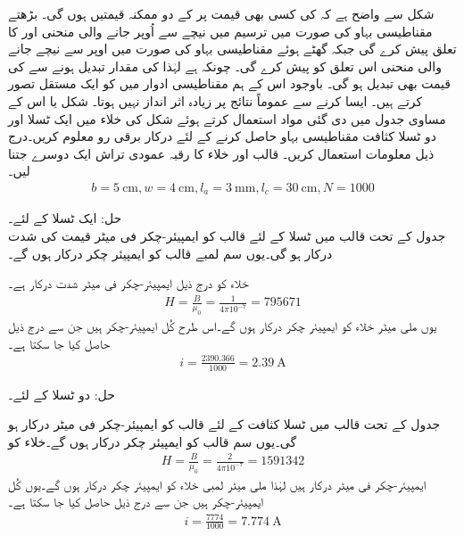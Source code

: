 شکل  سے واضح ہے کہ  کی کسی بھی قیمت پر  کے  دو ممکنہ قیمتیں ہوں گی۔ بڑھتے مقناطیسی بہاو کی صورت میں ترسیم میں نیچے سے اُوپر جانے والی منحنی  اور  کا تعلق پیش کرے گی جبکہ گھٹے ہوئے مقناطیسی بہاو کی صورت میں  اوپر سے نیچے جانے والی منحنی اس تعلق کو پیش کرے  گی۔  چونکہ  ہے  لہٰذا  کی  مقدار تبدیل ہونے سے  کی قیمت  بھی تبدیل ہو گی۔ باوجود اس کے ہم مقناطیسی ادوار میں   کو ایک مستقل تصور کرتے ہیں۔ ایسا کرنے سے عموماً نتائج پر زیادہ اثر انداز نہیں ہوتا۔
%
شکل   یا اس کے مساوی جدول  میں دی گئی مواد  استعمال کرتے ہوئے شکل   کی خلاء میں ایک ٹسلا اور دو ٹسلا کثافت  مقناطیسی بہاو حاصل کرنے کے لئے درکار برقی رو معلوم کریں۔درج ذیل معلومات استعمال کریں۔ قالب اور خلاء کا رقبہ عمودی تراش ایک دوسرے جتنا لیں۔
\begin{align*}
b=\SI{5}{\centi\meter},w=\SI{4}{\centi\meter},l_a=\SI{3}{\milli\meter},l_c=\SI{30}{\centi\meter},N=1000
\end{align*}


حل:\quad
 ایک ٹسلا کے لئے۔\\
 جدول  کے تحت قالب میں  ٹسلا  کے لئے  قالب کو   ایمپیئر-چکر فی  میٹر قیمت کی شدت   درکار ہو گی۔یوں  سم لمبے قالب کو   ایمپیئر چکر درکار ہوں گے۔

خلاء کو درج ذیل ایمپیئر-چکر فی میٹر شدت درکار ہے۔
\begin{align*}
H=\frac{B}{\mu_0}=\frac{1}{4\pi 10^{-7}}=\num{795671}
\end{align*}
یوں  ملی میٹر  خلاء کو  ایمپیئر چکر درکار ہوں گے۔اس طرح کُل ایمپیئر-چکر  ہیں جن سے  درج ذیل حاصل کیا جا سکتا ہے۔
\begin{align*}
i=\frac{2390.366}{1000}=\SI{2.39}{\ampere}
\end{align*}	

حل: دو ٹسلا کے لئے۔

جدول  کے تحت قالب میں  ٹسلا  کثافت کے لئے  قالب کو  ایمپیئر-چکر فی میٹر  درکار ہو گی۔یوں  سم  قالب کو  ایمپیئر چکر درکار ہوں گے۔خلاء کو
\begin{align*}
H=\frac{B}{\mu_0}=\frac{2}{4\pi 10^{-7}}=\num{1591342}
\end{align*}
ایمپیئر-چکر فی میٹر درکار ہیں لہٰذا  ملی میٹر لمبی خلاء کو    ایمپیئر چکر درکار ہوں گے۔یوں کُل ایمپیئر-چکر  ہیں جن سے  درج ذیل حاصل کیا جا سکتا ہے۔
\begin{align*}
i=\frac{7774}{1000}=\SI{7.774}{\ampere}
\end{align*}

